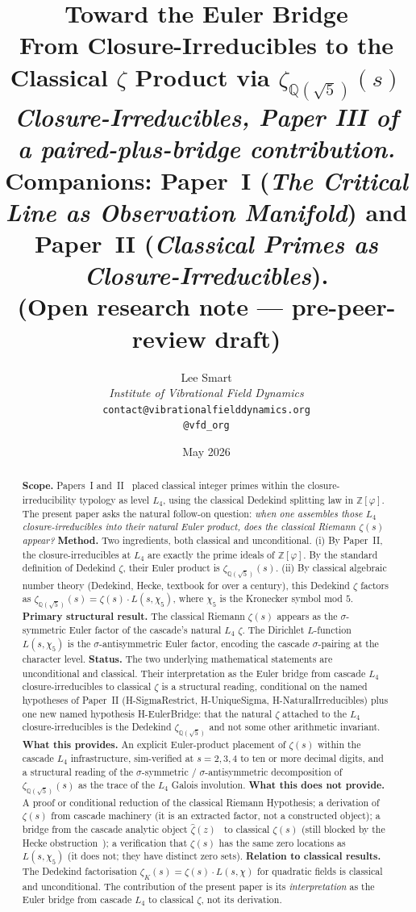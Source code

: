 \documentclass[11pt,a4paper]{article}
\title{\textbf{Toward the Euler Bridge}\\[2pt]
\large From Closure-Irreducibles to the Classical $\zeta$ Product via $\zeta_{\mathbb{Q}(\sqrt{5})}(s)$\\[2pt]
\normalsize \emph{Closure-Irreducibles, Paper III of a paired-plus-bridge contribution.}\\[1pt]
\small Companions: Paper~I (\emph{The Critical Line as Observation Manifold}) and Paper~II (\emph{Classical Primes as Closure-Irreducibles}).\\[1pt]
\small (Open research note --- pre-peer-review draft)}
\author{%
  Lee Smart\\[4pt]
  \textit{Institute of Vibrational Field Dynamics}\\[2pt]
  \texttt{contact@vibrationalfielddynamics.org}\\[2pt]
  \texttt{@vfd\_org}%
}
\date{May 2026}
\theoremstyle{definition}
\theoremstyle{remark}
\begin{document}
\maketitle
\thispagestyle{empty}

\begin{abstract}
\noindent
\textbf{Scope.} Papers~I and~II~\cite{CriticalLinePaperI,ClosurePrimesPaperII}
placed classical integer primes within the closure-irreducibility
typology as level $L_4$, using the classical Dedekind splitting law in
$\mathbb{Z}[\varphi]$. The present paper asks the natural follow-on
question: \emph{when one assembles those $L_4$ closure-irreducibles into
their natural Euler product, does the classical Riemann $\zeta(s)$
appear?}
\textbf{Method.} Two ingredients, both classical and unconditional. (i)
By Paper~II, the closure-irreducibles at $L_4$ are exactly the prime
ideals of $\mathbb{Z}[\varphi]$. By the standard definition of Dedekind
$\zeta$, their Euler product is $\zeta_{\mathbb{Q}(\sqrt{5})}(s)$. (ii)
By classical algebraic number theory (Dedekind, Hecke, textbook for
over a century), this Dedekind $\zeta$ factors as
$\zeta_{\mathbb{Q}(\sqrt{5})}(s) = \zeta(s) \cdot L(s, \chi_5)$, where
$\chi_5$ is the Kronecker symbol mod $5$.
\textbf{Primary structural result.} The classical Riemann $\zeta(s)$
appears as the $\sigma$-symmetric Euler factor of the cascade's natural
$L_4$ $\zeta$. The Dirichlet $L$-function $L(s, \chi_5)$ is the
$\sigma$-antisymmetric Euler factor, encoding the cascade $\sigma$-pairing
at the character level.
\textbf{Status.} The two underlying mathematical statements are
unconditional and classical. Their interpretation as the Euler bridge from
cascade $L_4$ closure-irreducibles to classical $\zeta$ is a structural
reading, conditional on the named hypotheses of Paper~II
(H-SigmaRestrict, H-UniqueSigma, H-NaturalIrreducibles) plus one new
named hypothesis H-EulerBridge: that the natural $\zeta$ attached to the
$L_4$ closure-irreducibles is the Dedekind $\zeta_{\mathbb{Q}(\sqrt{5})}$
and not some other arithmetic invariant.
\textbf{What this provides.} An explicit Euler-product placement of
$\zeta(s)$ within the cascade $L_4$ infrastructure, sim-verified at
$s = 2, 3, 4$ to ten or more decimal digits, and a structural reading of
the $\sigma$-symmetric / $\sigma$-antisymmetric decomposition of
$\zeta_{\mathbb{Q}(\sqrt{5})}(s)$ as the trace of the $L_4$ Galois
involution.
\textbf{What this does not provide.} A proof or conditional reduction of
the classical Riemann Hypothesis; a derivation of $\zeta(s)$ from
cascade machinery (it is an extracted factor, not a constructed object);
a bridge from the cascade analytic object
$\hat{\zeta}(z)$~\cite{rhFormalSmart} to classical $\zeta(s)$ (still
blocked by the Hecke obstruction~\cite{rhFormalSmart}); a verification
that $\zeta(s)$ has the same zero locations as $L(s, \chi_5)$ (it does
not; they have distinct zero sets).
\textbf{Relation to classical results.} The Dedekind factorisation
$\zeta_K(s) = \zeta(s) \cdot L(s, \chi)$ for quadratic fields is
classical and unconditional. The contribution of the present paper is
its \emph{interpretation} as the Euler bridge from cascade $L_4$ to
classical $\zeta$, not its derivation.
\end{abstract}
\end{document}
